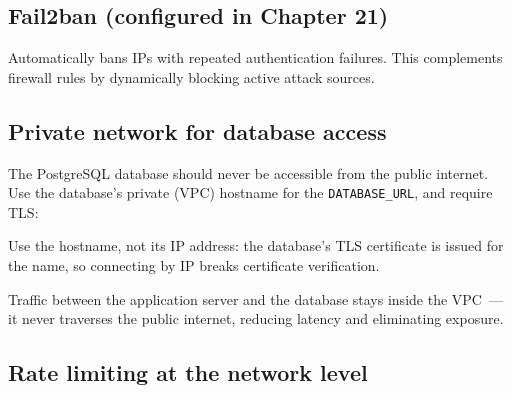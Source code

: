 \subsection*{Fail2ban (configured in Chapter 21)}\label{22-network-configuration:fail2ban-configured-in-chapter-21}

Automatically bans IPs with repeated authentication failures. This complements firewall rules by dynamically blocking active attack sources.

\subsection*{Private network for database access}\label{22-network-configuration:private-network-for-database-access}

The PostgreSQL database should never be accessible from the public internet. Use the database's private (VPC) hostname for the \texttt{DATABASE\_URL}, and require TLS:

\begin{codebox}[short]

\begin{Shaded}
\begin{Highlighting}[]
\OperatorTok{=}

\OperatorTok{=}
\end{Highlighting}
\end{Shaded}

\end{codebox}

\noindent{}Use the hostname, not its IP address: the database's TLS certificate is issued for the name, so connecting by IP breaks certificate verification.

Traffic between the application server and the database stays inside the VPC~--- it never traverses the public internet, reducing latency and eliminating exposure.

\subsection*{Rate limiting at the network level}\label{22-network-configuration:rate-limiting-at-the-network-level}

